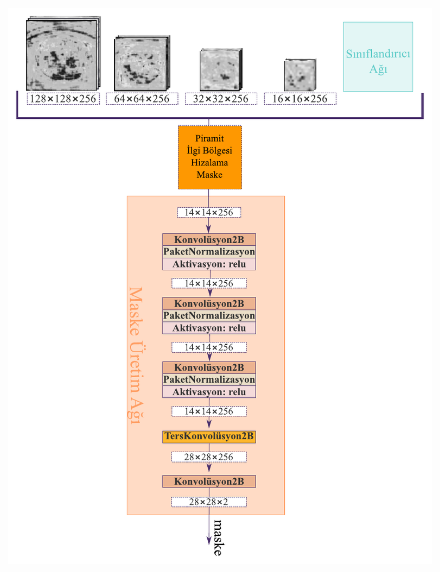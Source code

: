 \begin{figure}[h!]
	\begin{center}
		\vspace{0.4cm}
		{
			\vspace{0.4cm}
			\includegraphics[scale=0.88]{Yapilan-Calismalar/Figures/mask_generation_network.pdf}
		}
	\end{center}
\end{figure}

